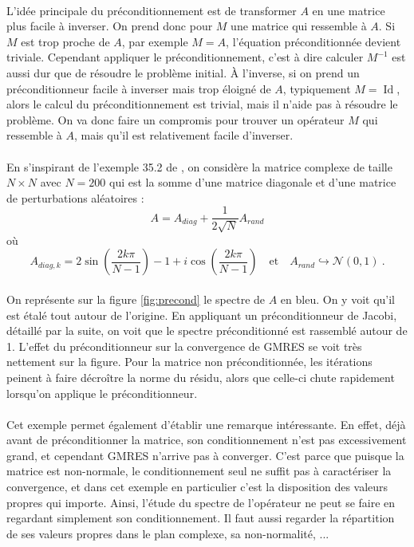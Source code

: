 		\paragraph{}
		L'idée principale du préconditionnement est de transformer $A$ en une matrice plus facile à inverser.
		On prend donc pour $M$ une matrice qui ressemble à $A$.
		Si $M$ est trop proche de $A$, par exemple $M=A$, l'équation préconditionnée devient triviale.
		Cependant appliquer le préconditionnement, c'est à dire calculer $M^{-1}$ est aussi dur que de résoudre le problème initial.
		À l'inverse, si on prend un préconditionneur facile à inverser mais trop éloigné de $A$, typiquement $M = \operatorname{Id}$, alors le calcul du préconditionnement est trivial, mais il n'aide pas à résoudre le problème.
		On va donc faire un compromis pour trouver un opérateur $M$ qui ressemble à $A$, mais qu'il est relativement facile d'inverser.

		\paragraph{}
		En s'inspirant de l'exemple 35.2 de \cite{TrefethenBau1997}, on considère la matrice complexe de taille $N\times N$ avec $N = 200$ qui est la somme d'une matrice diagonale et d'une matrice de perturbations aléatoires :
		\[A = A_{diag} + \frac{1}{2\sqrt{N}}A_{rand}\]
		où
		\[A_{diag, k} = 2\sin\left(\frac{2k\pi}{N-1}\right) - 1 + i\cos\left(\frac{2k\pi}{N-1}\right) \quad\textrm{et}\quad A_{rand}\hookrightarrow\mathcal{N}\left(0,1\right)\ .\]

		\paragraph{}
		On représente sur la figure \ref{fig:precond} le spectre de $A$ en bleu.
		On y voit qu'il est étalé tout autour de l'origine.
		En appliquant un préconditionneur de Jacobi, détaillé par la suite, on voit que le spectre préconditionné est rassemblé autour de 1.
		L'effet du préconditionneur sur la convergence de GMRES se voit très nettement sur la figure.
		Pour la matrice non préconditionnée, les itérations peinent à faire décroître la norme du résidu, alors que celle-ci chute rapidement lorsqu'on applique le préconditionneur.

		\paragraph{}
		Cet exemple permet également d'établir une remarque intéressante.
		En effet, déjà avant de préconditionner la matrice, son conditionnement n'est pas excessivement grand, et cependant GMRES n'arrive pas à converger.
		C'est parce que puisque la matrice est non-normale, le conditionnement seul ne suffit pas à caractériser la convergence, et dans cet exemple en particulier c'est la disposition des valeurs propres qui importe.
		Ainsi, l'étude du spectre de l'opérateur ne peut se faire en regardant simplement son conditionnement.
		Il faut aussi regarder la répartition de ses valeurs propres dans le plan complexe, sa non-normalité, ...

